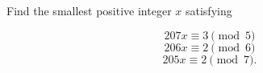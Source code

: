 Find the smallest positive integer $x$ satisfying

\[
207x \equiv 3 \pmod 5
\]\[
206x \equiv 2 \pmod 6
\]\[
205x \equiv 2 \pmod 7.
\]

